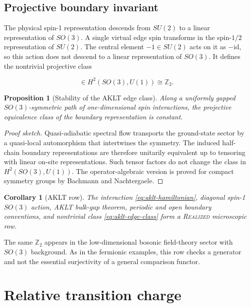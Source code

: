 \documentclass[12pt]{article}
\newtheorem{proposition}[theorem]{Proposition}
\newtheorem{corollary}[theorem]{Corollary}
\theoremstyle{definition}
\theoremstyle{remark}
\newcommand{\id}{\mathrm{id}}
\newcommand{\REAL}{\textnormal{\textsc{Realized}}}
\begin{document}
\subsection{Projective boundary invariant}

The physical spin-1 representation descends from $SU(2)$ to a linear
representation of $SO(3)$.  A single virtual edge spin transforms in the
spin-$1/2$ representation of $SU(2)$.  The central element $-1\in SU(2)$
acts on it as $-\id$, so this action does not descend to a linear
representation of $SO(3)$.  It defines the nontrivial projective class

\begin{equation}
  [\omega_{\mathrm{edge}}]
  \in H^2(SO(3),U(1))\cong\mathbb Z_2.
  \label{eq:aklt-edge-class}
\end{equation}

\begin{proposition}[Stability of the AKLT edge class]
\label{prop:aklt-edge}
Along a uniformly gapped $SO(3)$-symmetric path of one-dimensional spin
interactions, the projective equivalence class of the boundary
representation is constant.
\end{proposition}

\begin{proof}[Proof sketch]
Quasi-adiabatic spectral flow transports the ground-state sector by a
quasi-local automorphism that intertwines the symmetry.  The induced
half-chain boundary representations are therefore unitarily equivalent up
to tensoring with linear on-site representations.  Such tensor factors do
not change the class in $H^2(SO(3),U(1))$.  The operator-algebraic version is
proved for compact symmetry groups by Bachmann and Nachtergaele.
\end{proof}

\begin{corollary}[AKLT row]
The interaction \cref{eq:aklt-hamiltonian}, diagonal spin-1 $SO(3)$ action,
AKLT bulk-gap theorem, periodic and open boundary conventions, and
nontrivial class \cref{eq:aklt-edge-class} form a \REAL{} microscopic row.
\end{corollary}

The same $\mathbb Z_2$ appears in the low-dimensional bosonic field-theory
sector with $SO(3)$ background.  As in the fermionic examples, this row
checks a generator and not the essential surjectivity of a general
comparison functor.

\section{Relative transition charge}
\label{sec:relative}
\end{document}
